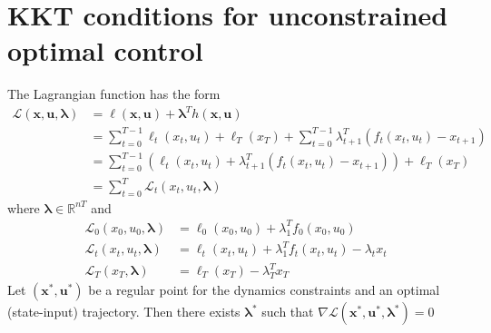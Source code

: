 \documentclass[openany]{book}
\newcommand{\R}{\mathbb{R}}                %
\theoremstyle{definition}
\theoremstyle{remark}
\begin{document}
\section{KKT conditions for unconstrained optimal control}

The Lagrangian function has the form 
\begin{align*}
    \mathcal{L}(\mathbf{x,u,\lambda}) &= \ell(\mathbf{x,u})+\boldsymbol{\lambda}^Th(\mathbf{x,u}) \\
    &= \displaystyle\sum_{t=0}^{T-1}\ell_t(x_t,u_t)+\ell_T(x_T) + \displaystyle\sum_{t=0}^{T-1}\lambda^T_{t+1}(f_t(x_t,u_t)-x_{t+1}) \\
    &= \displaystyle\sum_{t=0}^{T-1}\left(\ell_t(x_t,u_t)+\lambda^T_{t+1}(f_t(x_t,u_t)-x_{t+1})\right)+\ell_T(x_T) \\
    &=\displaystyle\sum_{t=0}^{T}\mathcal{L}_t(x_t,u_t,\boldsymbol{\lambda})
\end{align*}
where $\boldsymbol{\lambda}\in\R^{nT}$ and 
\begin{align*}
    \mathcal{L}_0(x_0,u_0,\boldsymbol{\lambda}) &= \ell_0(x_0,u_0)+\lambda_1^T f_0(x_0,u_0)\\
    \mathcal{L}_t(x_t,u_t,\boldsymbol{\lambda}) &= \ell_t(x_t,u_t)+\lambda_1^T f_t(x_t,u_t)-\lambda_tx_t\\
    \mathcal{L}_T(x_T,\boldsymbol{\lambda}) &= \ell_T(x_T) - \lambda_T^Tx_T
\end{align*}
Let $(\mathbf{x}^*,\mathbf{u}^*)$ be a regular point for the dynamics constraints and an optimal (state-input) trajectory. Then there exists $\boldsymbol{\lambda}^*$ such that $\nabla \mathcal{L}(\mathbf{x}^*,\mathbf{u}^*,\boldsymbol{\lambda}^*)=0$ 
\end{document}
